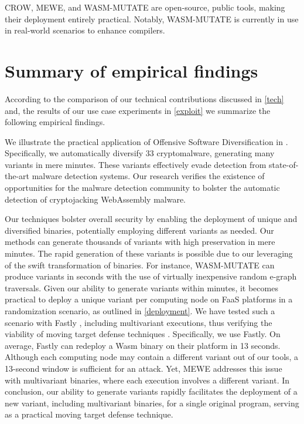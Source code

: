 CROW, MEWE, and WASM-MUTATE are open-source, public tools, making their deployment entirely practical. 
Notably, WASM-MUTATE is currently in use in real-world scenarios to enhance \Wasm compilers.

\section{Summary of empirical findings}

According to the comparison of our technical contributions discussed in \autoref{tech} and, the results of our use case experiments in \autoref{exploit} we summarize the following empirical findings.


\begin{strategy}
    We illustrate the practical application of Offensive Software Diversification in \Wasm. 
    Specifically, we automatically diversify 33 \Wasm cryptomalware, generating many variants in mere minutes.
    These variants effectively evade detection from state-of-the-art malware detection systems.
    Our research verifies the existence of opportunities for the malware detection community to bolster the automatic detection of cryptojacking WebAssembly malware. 
    
\end{strategy}

\begin{strategy}
    Our techniques bolster overall security by enabling the deployment of unique and diversified \Wasm binaries, potentially employing different variants as needed.
    Our methods can generate thousands of variants with high preservation in mere minutes.
    The rapid generation of these variants is possible due to our leveraging of the swift transformation of \Wasm binaries.
    For instance, WASM-MUTATE can produce variants in seconds with the use of virtually inexpensive random e-graph traversals.
    Given our ability to generate variants within minutes, it becomes practical to deploy a unique variant per computing node on FaaS platforms in a randomization scenario, as outlined in \autoref{deployment}.
    We have tested such a scenario with Fastly \cite{MEWE}, including multivariant executions, thus verifying the viability of moving target defense techniques \cite{jackson2011compiler}.
    Specifically, we use Fastly.
    On average, Fastly can redeploy a Wasm binary on their platform in 13 seconds.
    Although each computing node may contain a different \Wasmb variant out of our tools, a 13-second window is sufficient for an attack.
    Yet, MEWE addresses this issue with multivariant binaries, where each execution involves a different variant.
    In conclusion, our ability to generate variants rapidly facilitates the deployment of a new variant, including multivariant binaries, for a single \Wasm original program, serving as a practical moving target defense technique.
\end{strategy}


